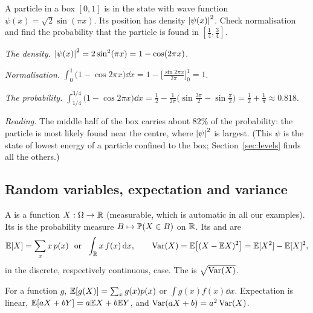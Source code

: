 \begin{example}\label{ex:box}
  A particle in a box $[0,1]$ is in the state with wave function $\psi(x)=\sqrt2\sin(\pi x)$. Its position has density $\left|\psi(x)\right|^2$. Check normalisation and find the probability that the particle is found in $[\tfrac14,\tfrac34]$.
\end{example}
\begin{solution}
  \begin{steps}
    \item \emph{The density.} $\left|\psi(x)\right|^2=2\sin^2(\pi x)=1-\cos(2\pi x)$.
    \item \emph{Normalisation.} $\int_0^1\bigl(1-\cos2\pi x\bigr)\dd x=1-\bigl[\tfrac{\sin2\pi x}{2\pi}\bigr]_0^1=1$.
    \item \emph{The probability.} $\int_{1/4}^{3/4}\bigl(1-\cos2\pi x\bigr)\dd x=\tfrac12-\tfrac1{2\pi}\bigl(\sin\tfrac{3\pi}2-\sin\tfrac\pi2\bigr)=\tfrac12+\tfrac1\pi\approx0.818$.
    \item \emph{Reading.} The middle half of the box carries about $82\%$ of the probability: the particle is most likely found near the centre, where $\left|\psi\right|^2$ is largest. (This $\psi$ is the state of lowest energy of a particle confined to the box; Section~\ref{sec:levels} finds all the others.)
  \end{steps}
\end{solution}

\subsection{Random variables, expectation and variance}

\begin{definition}\label{def:rv}
  A  is a function $X:\Omega\to\mathbb{R}$ (measurable, which is automatic in all our examples). Its  is the probability measure $B\mapsto\mathbb{P}(X\in B)$ on $\mathbb{R}$. Its  and  are
  \[
    \EE[X]=\sum_xx\,p(x)\ \text{ or }\ \int_{\R}x\,f(x)\dd x,\qquad
    \Var(X)=\EE\bigl[(X-\EE X)^2\bigr]=\EE[X^2]-\EE[X]^2 ,
  \]
  in the discrete, respectively continuous, case. The  is $\sqrt{\operatorname{Var}(X)}$.
\end{definition}

For a function $g$, $\mathbb{E}[g(X)]=\sum_xg(x)p(x)$ or $\int g(x)f(x)\dd x$. Expectation is linear, $\mathbb{E}[aX+bY]=a\mathbb{E} X+b\mathbb{E} Y$, and $\operatorname{Var}(aX+b)=a^2\operatorname{Var}(X)$.

